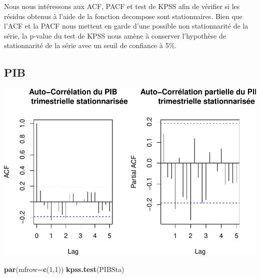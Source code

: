 \documentclass[11pt,]{article}
\newenvironment{Shaded}{\begin{snugshade}}{\end{snugshade}}
\newcommand{\KeywordTok}[1]{\textcolor[rgb]{0.13,0.29,0.53}{\textbf{{#1}}}}
\newcommand{\DataTypeTok}[1]{\textcolor[rgb]{0.13,0.29,0.53}{{#1}}}
\newcommand{\DecValTok}[1]{\textcolor[rgb]{0.00,0.00,0.81}{{#1}}}
\newcommand{\StringTok}[1]{\textcolor[rgb]{0.31,0.60,0.02}{{#1}}}
\newcommand{\NormalTok}[1]{{#1}}
\begin{document}
Nous nous intéressons aux ACF, PACF et test de KPSS afin de vérifier si
les résidus obtenus à l'aide de la fonction decompose sont
stationnaires. Bien que l'ACF et la PACF nous mettent en garde d'une
possible non stationnarité de la série, la p-value du test de KPSS nous
amène à conserver l'hypothèse de stationnarité de la série avec un seuil
de confiance à 5\%.

\subsection{PIB}\label{pib-1}

\begin{Shaded}
\end{Shaded}

\includegraphics{doc_files/figure-latex/unnamed-chunk-7-1.pdf}

\begin{Shaded}
\begin{Highlighting}[]
  \KeywordTok{par}\NormalTok{(}\DataTypeTok{mfrow=}\KeywordTok{c}\NormalTok{(}\DecValTok{1}\NormalTok{,}\DecValTok{1}\NormalTok{))}
  \KeywordTok{kpss.test}\NormalTok{(PIBSta)}
\end{Highlighting}
\end{Shaded}
\end{document}
